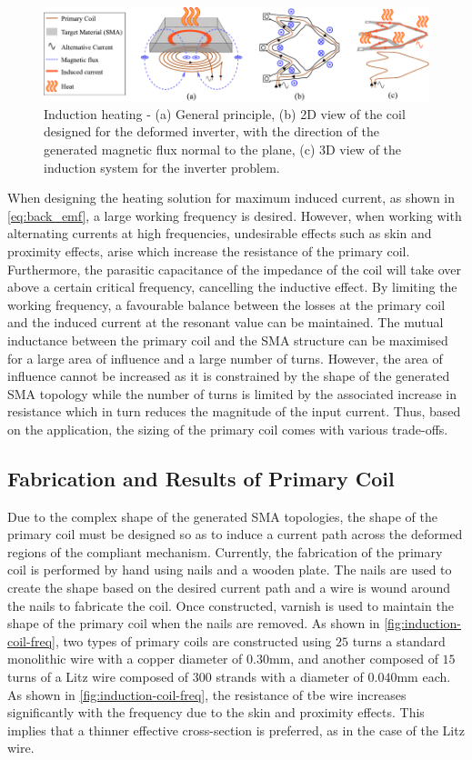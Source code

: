\begin{figure}[hbt!]
  \centering
  \includegraphics[width=\textwidth]{images/chap5/07_final_schematic_induction.pdf}
  \caption{Induction heating - (a) General principle, (b) 2D view of the coil designed for the deformed inverter, with the direction of the generated magnetic flux normal to the plane, (c) 3D view of the induction system for the inverter problem.}
  \label{fig:induction_schematic}
\end{figure}

When designing the heating solution for maximum induced current, as shown in \cref{eq:back_emf}, a large working frequency is desired. However, when working with alternating currents at high frequencies, undesirable effects such as skin and proximity effects, arise which increase the resistance of the primary coil. Furthermore, the parasitic capacitance of the impedance of the coil will take over above a certain critical frequency, cancelling the inductive effect. By limiting the working frequency, a favourable balance between the losses at the primary coil and the induced current at the resonant value can be maintained. The mutual inductance between the primary coil and the SMA structure can be maximised for a large area of influence and a large number of turns. However, the area of influence cannot be increased as it is constrained by the shape of the generated SMA topology while the number of turns is limited by the associated increase in resistance which in turn reduces the magnitude of the input current. Thus, based on the application, the sizing of the primary coil comes with various trade-offs.

\subsection{Fabrication and Results of Primary Coil}
Due to the complex shape of the generated SMA topologies, the shape of the primary coil must be designed so as to induce a current path across the deformed regions of the compliant mechanism. Currently, the fabrication of the primary coil is performed by hand using nails and a wooden plate. The nails are used to create the shape based on the desired current path and a wire is wound around the nails to fabricate the coil. Once constructed, varnish is used to maintain the shape of the primary coil when the nails are removed. As shown in \cref{fig:induction-coil-freq}, two types of primary coils are constructed using $25$ turns a standard monolithic wire with a copper diameter of $0.30$mm, and another composed of $15$ turns of a Litz wire composed of $300$ strands with a diameter of $0.040$mm each. As shown in \cref{fig:induction-coil-freq}, the resistance of tbe wire increases significantly with the frequency due to the skin and proximity effects. This implies that a thinner effective cross-section is preferred, as in the case of the Litz wire.

